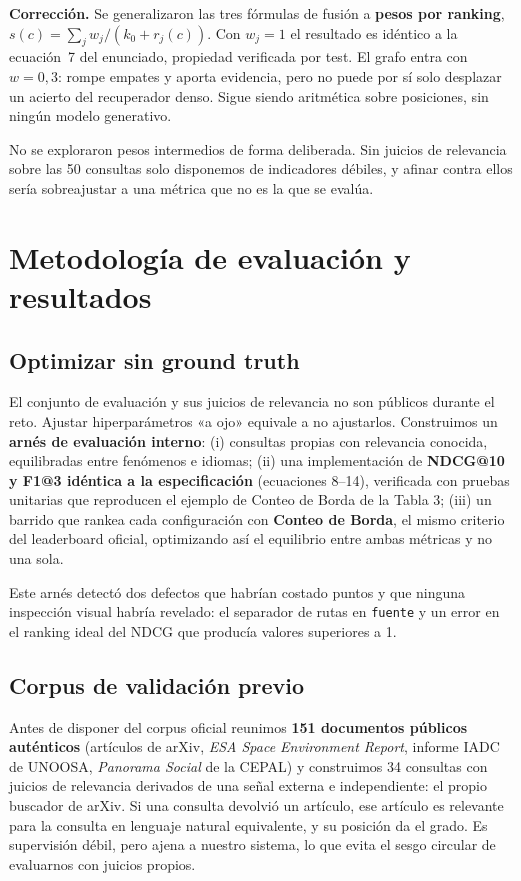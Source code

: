 \documentclass[10pt,a4paper]{article}
\begin{document}
\textbf{Corrección.} Se generalizaron las tres fórmulas de fusión a \textbf{pesos por ranking},
$s(c) = \sum_j w_j / (k_0 + r_j(c))$. Con $w_j = 1$ el resultado es idéntico a la ecuación~7 del
enunciado, propiedad verificada por test. El grafo entra con $w = 0{,}3$: rompe empates y aporta
evidencia, pero no puede por sí solo desplazar un acierto del recuperador denso. Sigue siendo
aritmética sobre posiciones, sin ningún modelo generativo.

No se exploraron pesos intermedios de forma deliberada. Sin juicios de relevancia sobre las 50
consultas solo disponemos de indicadores débiles, y afinar contra ellos sería sobreajustar a una
métrica que no es la que se evalúa.

\section{Metodología de evaluación y resultados}

\subsection{Optimizar sin ground truth}

El conjunto de evaluación y sus juicios de relevancia no son públicos durante el reto. Ajustar
hiperparámetros «a ojo» equivale a no ajustarlos. Construimos un \textbf{arnés de evaluación
interno}: (i) consultas propias con relevancia conocida, equilibradas entre fenómenos e idiomas;
(ii) una implementación de \textbf{NDCG@10 y F1@3 idéntica a la especificación} (ecuaciones 8–14),
verificada con pruebas unitarias que reproducen el ejemplo de Conteo de Borda de la Tabla 3;
(iii) un barrido que rankea cada configuración con \textbf{Conteo de Borda}, el mismo criterio del
leaderboard oficial, optimizando así el equilibrio entre ambas métricas y no una sola.

Este arnés detectó dos defectos que habrían costado puntos y que ninguna inspección visual habría
revelado: el separador de rutas en \texttt{fuente} y un error en el ranking ideal del NDCG que
producía valores superiores a 1.

\subsection{Corpus de validación previo}

Antes de disponer del corpus oficial reunimos \textbf{151 documentos públicos auténticos}
(artículos de arXiv, \emph{ESA Space Environment Report}, informe IADC de UNOOSA, \emph{Panorama
Social} de la CEPAL) y construimos 34 consultas con juicios de relevancia derivados de una señal
externa e independiente: el propio buscador de arXiv. Si una consulta devolvió un artículo, ese
artículo es relevante para la consulta en lenguaje natural equivalente, y su posición da el grado.
Es supervisión débil, pero ajena a nuestro sistema, lo que evita el sesgo circular de evaluarnos
con juicios propios.
\end{document}
